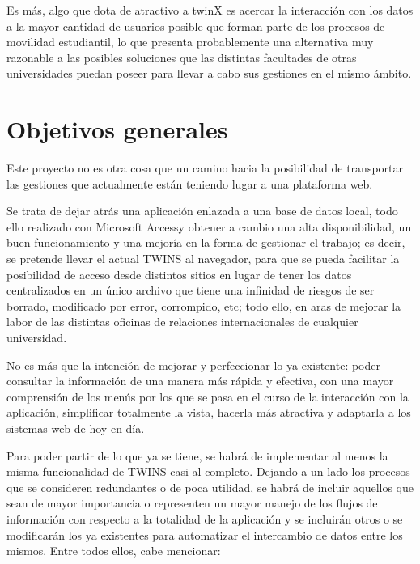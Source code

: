Es más, algo que dota de atractivo a twinX es acercar la interacción con los datos a la mayor cantidad de usuarios posible que forman parte de los procesos de movilidad estudiantil, lo que presenta probablemente una alternativa muy razonable a las posibles soluciones que las distintas facultades de otras universidades puedan poseer para llevar a cabo sus gestiones en el mismo ámbito.

\section{Objetivos generales}

Este proyecto no es otra cosa que un camino hacia la posibilidad de transportar las gestiones que actualmente están teniendo lugar a una plataforma web.

Se trata de dejar atrás una aplicación enlazada a una base de datos local, todo ello realizado con Microsoft Access\textregistered y obtener a cambio una alta disponibilidad, un buen funcionamiento y una mejoría en la forma de gestionar el trabajo; es decir, se pretende llevar el actual TWINS al navegador, para que se pueda facilitar la posibilidad de acceso desde distintos sitios en lugar de tener los datos centralizados en un único archivo que tiene una infinidad de riesgos de ser borrado, modificado por error, corrompido, etc; todo ello, en aras de mejorar la labor de las distintas oficinas de relaciones internacionales de cualquier universidad.

No es más que la intención de mejorar y perfeccionar lo ya existente: poder consultar la información de una manera más rápida y efectiva, con una mayor comprensión de los menús por los que se pasa en el curso de la interacción con la aplicación, simplificar totalmente la vista, hacerla más atractiva y adaptarla a los sistemas web de hoy en día.

Para poder partir de lo que ya se tiene, se habrá de implementar al menos la misma funcionalidad de TWINS casi al completo. Dejando a un lado los procesos que se consideren redundantes o de poca utilidad, se habrá de incluir aquellos que sean de mayor importancia o representen un mayor manejo de los flujos de información con respecto a la totalidad de la aplicación y se incluirán otros o se modificarán los ya existentes para automatizar el intercambio de datos entre los mismos. Entre todos ellos, cabe mencionar:

